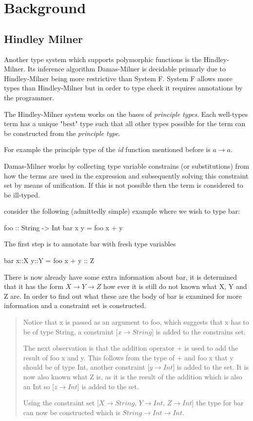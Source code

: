 \chapter{Background}
\section{Hindley Milner}
Another type system which supports polymorphic functions is the Hindley-Milner. Its inference algorithm Damas-Milner is decidable primarly due to Hindley-Milner being more restrictive than System F. System F allows more types than Hindley-Milner but in order to type check it requires annotations by the programmer.

The Hindley-Milner system works on the bases of \textit{principle types}. Each well-types term has a unique "best" type such that all other types possible for the term can be constructed from the \textit{principle type}. 

For example the principle type of the \textit{id} function mentioned before is $a \rightarrow a$.

Damas-Milner works by collecting type variable constrains (or substitutions) from how the terms are used in the expression and subsequently solving this constraint set by means of unification. If this is not possible then the term is considered to be ill-typed.

consider the following (admittedly simple) example where we wish to type bar:
\begin{code}
foo :: String -> Int
bar x y = foo x + y
\end{code}

The first step is to annotate bar with fresh type variables 
\begin{code}
bar x::X y::Y = foo x + y :: Z
\end{code}

There is now already have some extra information about bar, it is determined that it has the form $X \rightarrow Y \rightarrow Z$ 
how ever it is still do not known what X, Y and Z are. In order to find out what these are the body of bar is examined for more information and a constraint set is constructed.

\begin{quotation}
Notice that x is passed as an argument to foo, which suggests that x has to be of type String, a constraint [$x\rightarrow String$] is added to the constrains set.

The next observation is that the addition operator + is used to add the result of foo x and y. This follows from the type of + and foo x that y should be of type Int, another constraint [$y\rightarrow Int$] is added to the set. It is now also known what Z is, as it is the result of the addition which is also an Int so [$z\rightarrow Int$] is added to the set.

Using the constraint set {$[X\rightarrow String$, $Y\rightarrow Int$, $Z\rightarrow Int$]} the type for bar can now be constructed which is $String \rightarrow Int \rightarrow Int$.
\end{quotation}


